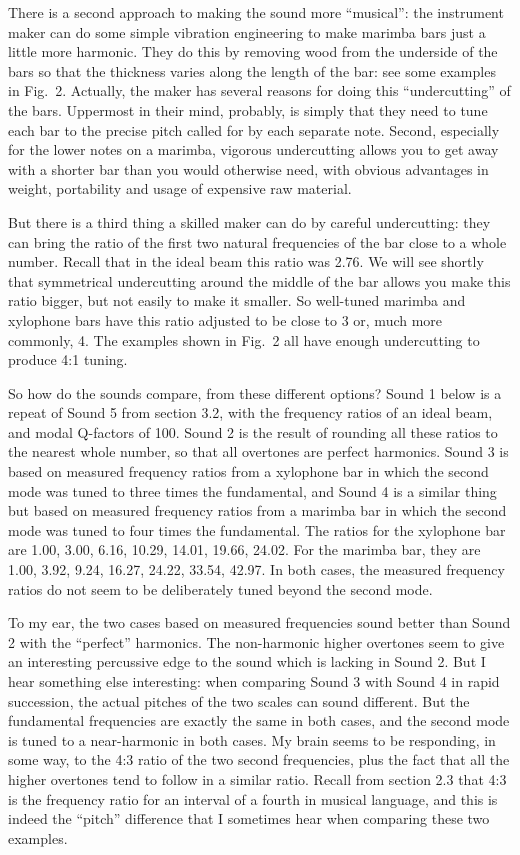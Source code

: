   There is a second approach to making the sound more ``musical'': the 
  instrument maker can do some simple vibration engineering to make marimba 
  bars just a little more harmonic. They do this by removing wood from the 
  underside of the bars so that the thickness varies along the length of the 
  bar: see some examples in Fig.\ 2. Actually, the maker has several reasons 
  for doing this ``undercutting'' of the bars. Uppermost in their mind, 
  probably, is simply that they need to tune each bar to the precise pitch 
  called for by each separate note. Second, especially for the lower notes on a 
  marimba, vigorous undercutting allows you to get away with a shorter bar than 
  you would otherwise need, with obvious advantages in weight, portability and 
  usage of expensive raw material. 

  But there is a third thing a skilled maker can do by careful undercutting: 
  they can bring the ratio of the first two natural frequencies of the bar 
  close to a whole number. Recall that in the ideal beam this ratio was 2.76. 
  We will see shortly that symmetrical undercutting around the middle of the 
  bar allows you make this ratio bigger, but not easily to make it smaller. So 
  well-tuned marimba and xylophone bars have this ratio adjusted to be close to 
  3 or, much more commonly, 4. The examples shown in Fig.\ 2 all have enough 
  undercutting to produce 4:1 tuning. 

  So how do the sounds compare, from these different options? Sound 1 below is 
  a repeat of Sound 5 from section 3.2, with the frequency ratios of an ideal 
  beam, and modal Q-factors of 100. Sound 2 is the result of rounding all these 
  ratios to the nearest whole number, so that all overtones are perfect 
  harmonics. Sound 3 is based on measured frequency ratios from a xylophone bar 
  in which the second mode was tuned to three times the fundamental, and Sound 
  4 is a similar thing but based on measured frequency ratios from a marimba 
  bar in which the second mode was tuned to four times the fundamental. The 
  ratios for the xylophone bar are 1.00, 3.00, 6.16, 10.29, 14.01, 19.66, 
  24.02. For the marimba bar, they are 1.00, 3.92, 9.24, 16.27, 24.22, 33.54, 
  42.97. In both cases, the measured frequency ratios do not seem to be 
  deliberately tuned beyond the second mode. 

  To my ear, the two cases based on measured frequencies sound better than 
  Sound 2 with the ``perfect'' harmonics. The non-harmonic higher overtones 
  seem to give an interesting percussive edge to the sound which is lacking in 
  Sound 2. But I hear something else interesting: when comparing Sound 3 with 
  Sound 4 in rapid succession, the actual pitches of the two scales can sound 
  different. But the fundamental frequencies are exactly the same in both 
  cases, and the second mode is tuned to a near-harmonic in both cases. My 
  brain seems to be responding, in some way, to the 4:3 ratio of the two second 
  frequencies, plus the fact that all the higher overtones tend to follow in a 
  similar ratio. Recall from section 2.3 that 4:3 is the frequency ratio for an 
  interval of a fourth in musical language, and this is indeed the ``pitch'' 
  difference that I sometimes hear when comparing these two examples. 


